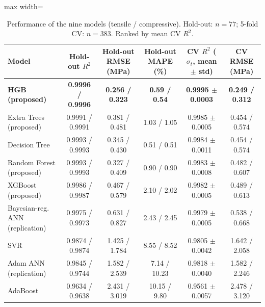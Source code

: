\documentclass[conference,12pt]{IEEEtran}
\newcommand{\st}{\ensuremath{\sigma_t}}
\begin{document}
\begin{table}[!t]
\caption{Performance of the nine models (tensile / compressive). Hold-out: $n = 77$; 5-fold CV: $n = 383$. Ranked by mean CV $R^2$.}
\label{tab:models}
\centering
\begin{adjustbox}{max width=\textwidth}
\begin{tabular}{@{}lccccc@{}}
\toprule
Model & Hold-out $R^2$ & Hold-out RMSE (MPa) & Hold-out MAPE (\%) & CV $R^2$ (\st, mean $\pm$ std) & CV RMSE (MPa) \\
\midrule
\textbf{HGB (proposed)} & \textbf{0.9996 / 0.9996} & \textbf{0.256 / 0.323} & \textbf{0.59 / 0.54} & \textbf{0.9995 $\pm$ 0.0003} & \textbf{0.249 / 0.312} \\
Extra Trees (proposed) & 0.9991 / 0.9991 & 0.381 / 0.481 & 1.03 / 1.05 & 0.9985 $\pm$ 0.0005 & 0.454 / 0.574 \\
Decision Tree & 0.9993 / 0.9993 & 0.345 / 0.430 & 0.51 / 0.51 & 0.9984 $\pm$ 0.0011 & 0.454 / 0.574 \\
Random Forest (proposed) & 0.9993 / 0.9993 & 0.327 / 0.409 & 0.90 / 0.90 & 0.9983 $\pm$ 0.0008 & 0.482 / 0.607 \\
XGBoost (proposed) & 0.9986 / 0.9987 & 0.467 / 0.579 & 2.10 / 2.02 & 0.9982 $\pm$ 0.0005 & 0.489 / 0.613 \\
Bayesian-reg. ANN (replication) & 0.9975 / 0.9973 & 0.631 / 0.827 & 2.43 / 2.45 & 0.9979 $\pm$ 0.0005 & 0.538 / 0.668 \\
SVR & 0.9874 / 0.9874 & 1.425 / 1.784 & 8.55 / 8.52 & 0.9805 $\pm$ 0.0042 & 1.642 / 2.058 \\
Adam ANN (replication) & 0.9845 / 0.9744 & 1.582 / 2.539 & 7.14 / 10.23 & 0.9818 $\pm$ 0.0040 & 1.582 / 2.246 \\
AdaBoost & 0.9634 / 0.9638 & 2.431 / 3.019 & 10.15 / 9.80 & 0.9561 $\pm$ 0.0057 & 2.478 / 3.120 \\
\bottomrule
\end{tabular}
\end{adjustbox}
\end{table}
\end{document}
